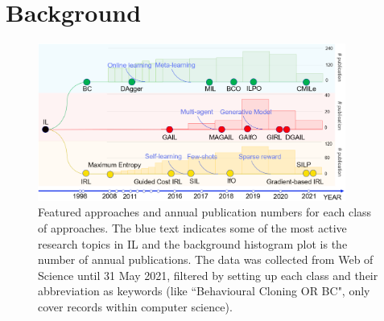 \documentclass[acmsmall]{acmart}
\begin{document}
\section{Background}\label{Background}

\begin{figure}[t]
      \centering
      \includegraphics[width=0.9\textwidth]{Fig1.png}
      \caption{Featured approaches and annual publication numbers for each class of approaches. The blue text indicates some of the most active research topics in IL and the background histogram plot is the number of annual publications. The data was collected from Web of Science until 31 May 2021, filtered by setting up each class and their abbreviation as keywords (like ``Behavioural Cloning OR BC", only cover records within computer science). }
      \label{fig_keyword}
\end{figure}
\end{document}
